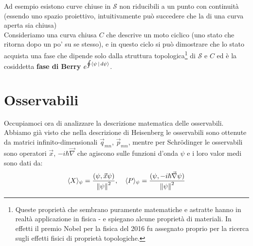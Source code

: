 \documentclass[FisicaTeorica.tex]{subfiles}
\begin{document}
\begin{enumerate}
	Ad esempio esistono curve chiuse in $\mathcal{S}$ non riducibili a un punto con continuità (essendo uno spazio proiettivo, intuitivamente può succedere che la  di una curva aperta sia chiusa)\\
	Consideriamo una curva chiusa $C$ che descrive un moto ciclico (uno stato che ritorna dopo un po' su se stesso), e in questo ciclo si può dimostrare che lo stato acquista una fase che dipende solo dalla struttura topologica\footnote{Queste proprietà che sembrano puramente matematiche e astratte hanno in realtà applicazione in fisica - e spiegano alcune proprietà di materiali. In effetti il premio Nobel per la fisica del 2016 fu assegnato proprio per la ricerca sugli effetti fisici di proprietà topologiche.} di $\mathcal{S}$ e $C$ ed è la cosiddetta \textbf{fase di Berry} $e^{\oint \Braket{\psi|d\psi}}$. 
\end{enumerate}
	
\section{Osservabili}
Occupiamoci ora di analizzare la descrizione matematica delle osservabili.\\
Abbiamo già visto che nella descrizione di Heisenberg le osservabili sono ottenute da matrici infinito-dimensionali ${\vec{q}}_{mn}$, ${\vec{p}}_{mn}$, mentre per Schrödinger le osservabili sono operatori $\vec{x}$, $-i\hbar \vec{\nabla}$ che agiscono sulle funzioni d'onda $\psi$ e i loro valor medi sono dati da:
\[
\langle X\rangle_\psi = \frac{(\psi, \vec{x}\psi)}{\left\lVert\psi\right\rVert^2}, \quad \langle P\rangle_\psi = \frac{(\psi, -i\hbar \vec{\nabla}\psi)}{\left\lVert\psi\right\rVert^2}
\]
\end{document}
